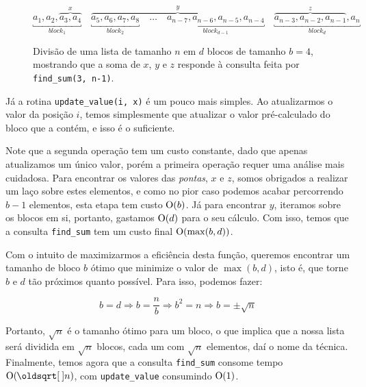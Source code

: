 \begin{figure}
    \centering
    \begin{equation*}
        \underbracket{a_1, a_2, \overbrace{a_3, a_4}^x}_{block_1} \quad
        \overbrace{
            \underbracket{a_5, a_6, a_7, a_8}_{block_2} \quad
            \dots \quad
            \underbracket{a_{n-7}, a_{n-6}, a_{n-5}, a_{n-4}}_{block_{d-1}}
        }^y \quad
        \underbracket{\overbrace{a_{n-3}, a_{n-2}, a_{n-1}}^z, a_n}_{block_d}
    \end{equation*}
    \caption{Divisão de uma lista de tamanho $n$ em $d$ blocos de tamanho $b = 4$, mostrando que a soma de $x$, $y$ e $z$ responde à consulta feita por \texttt{find\_sum(3, n-1)}.}
    \label{fig:sqrt-decomp-blocks}
\end{figure}

Já a rotina \texttt{update\_value(i, x)} é um pouco mais simples. Ao atualizarmos o valor da posição $i$, temos simplesmente que atualizar o valor pré-calculado do bloco que a contém, e isso é o suficiente.

Note que a segunda operação tem um custo constante, dado que apenas atualizamos um único valor, porém a primeira operação requer uma análise mais cuidadosa. Para encontrar os valores das \emph{pontas}, $x$ e $z$, somos obrigados a realizar um laço sobre estes elementos, e como no pior caso podemos acabar percorrendo $b-1$ elementos, esta etapa tem custo $\mathrm{O}(b)$. Já para encontrar $y$, iteramos sobre os blocos em si, portanto, gastamos $\mathrm{O}(d)$ para o seu cálculo. Com isso, temos que a consulta \texttt{find\_sum} tem um custo final $\mathrm{O}(\max(b, d))$.

Com o intuito de maximizarmos a eficiência desta função, queremos encontrar um tamanho de bloco $b$ ótimo que minimize o valor de $\max(b, d)$, isto é, que torne $b$ e $d$ tão próximos quanto possível. Para isso, podemos fazer:

\begin{equation}
    b = d \Rightarrow
    b = \frac{n}{b} \Rightarrow
    b^2 = n \Rightarrow
    b = \pm \sqrt{n}
\end{equation}

Portanto, $\sqrt{n}$ é o tamanho ótimo para um bloco, o que implica que a nossa lista será dividida em $\sqrt{n}$ blocos, cada um com $\sqrt{n}$ elementos, daí o nome da técnica. Finalmente, temos agora que a consulta \texttt{find\_sum} consome tempo $\Oh(\sqrt{n})$, com \texttt{update\_value} consumindo $\mathrm{O}(1)$.

